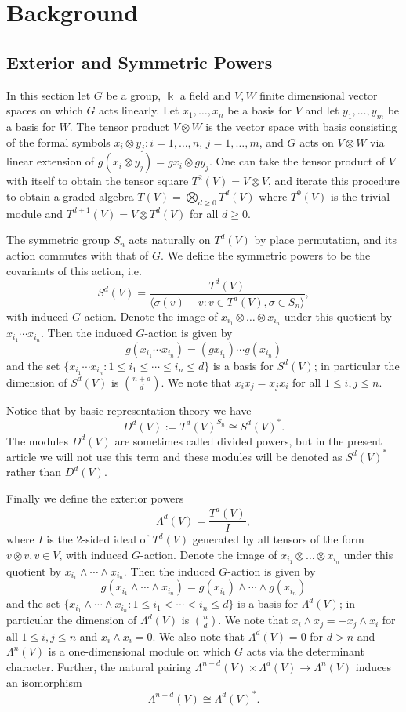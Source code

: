 \documentclass[a4paper]{amsart}
\newcommand{\kk}{\Bbbk}
\theoremstyle{definition}
\theoremstyle{remark}
\theoremstyle{Acknowledgments}
\begin{document}
\section{Background}
\subsection{Exterior and Symmetric Powers}

In this section let $G$ be a group, $\kk$ a field and $V, W$ finite dimensional vector spaces on which $G$ acts linearly. Let $x_1, \ldots, x_n$ be a basis for $V$ and let $y_1, \ldots, y_m$ be a basis for $W$. The tensor product $V \otimes W$ is the vector space with basis consisting of the formal symbols $x_i \otimes y_j: i=1, \ldots,n$, $j=1, \ldots, m$, and $G$ acts on $V \otimes W$ via linear extension of $g(x_i \otimes y_j) = gx_i \otimes gy_j$. One can take the tensor product of $V$ with itself to obtain the tensor square $T^2(V) = V \otimes V$, and iterate this procedure to obtain a graded algebra $T(V) = \bigotimes_{d \geq 0} T^d(V)$ where $T^0(V)$ is the trivial module and $T^{d+1}(V) = V \otimes T^d(V)$ for all $d \geq 0$.

The symmetric group $S_n$ acts naturally on $T^d(V)$ by place permutation, and its action commutes with that of $G$. We define the symmetric powers to be the covariants of this action, i.e.
\[S^d(V) = \frac{T^d(V)}{\langle \sigma(v)-v: v \in T^d(V), \sigma \in S_n\rangle},\]
with induced $G$-action. Denote the image of $x_{i_1} \otimes \ldots \otimes x_{i_n}$ under this quotient by $x_{i_1} \cdots x_{i_n}$. Then the induced $G$-action is given by
\[g(x_{i_1} \cdots x_{i_n}) = (gx_{i_1}) \cdots g(x_{i_n})\] and the set $\{x_{i_1} \cdots x_{i_n}: 1 \leq i_1 \leq \cdots \leq i_n \leq d\}$ is a basis for $S^d(V)$; in particular the dimension of $S^d(V)$ is $\binom{n+d}{d}$. We note that $x_ix_j = x_jx_i$ for all $1 \leq i,j \leq n$.

Notice that by basic representation theory we have
\[D^d(V):= T^d(V)^{S_n} \cong S^d(V)^*.\] The modules $D^d(V)$ are sometimes called divided powers, but in the present article we will not use this term and these modules will be denoted as $S^d(V)^*$ rather than $D^d(V)$. 

Finally we define the exterior powers
\[\Lambda^d(V) = \frac{T^d(V)}{I},\] where $I$ is the 2-sided ideal of $T^d(V)$ generated by all tensors of the form $v \otimes v, v \in V$, with induced $G$-action. Denote the image of  $x_{i_1} \otimes \ldots \otimes x_{i_n}$ under this quotient by $x_{i_1} \wedge \cdots \wedge x_{i_n}$. Then the induced $G$-action is given by
\[g(x_{i_1} \wedge \cdots \wedge x_{i_n}) = g(x_{i_1}) \wedge \cdots \wedge g(x_{i_n})\] and the set $\{x_{i_1} \wedge \cdots \wedge x_{i_n}: 1 \leq i_1 < \cdots < i_n \leq d\}$ is a basis for $\Lambda^d(V)$; in particular the dimension of $\Lambda^d(V)$ is $\binom{n}{d}$. We note that $x_i \wedge x_j = -x_j \wedge x_i$ for all $1 \leq i,j \leq n$ and $x_i \wedge x_i = 0$. We also note that $\Lambda^d(V) = 0$ for $d>n$ and $\Lambda^n(V)$ is a one-dimensional module on which $G$ acts via the determinant character. Further, the natural pairing $\Lambda^{n-d}(V) \times \Lambda^d(V) \rightarrow \Lambda^n(V)$ induces an isomorphism
\[ \Lambda^{n-d}(V) \cong \Lambda^d(V)^*.\]
\end{document}

